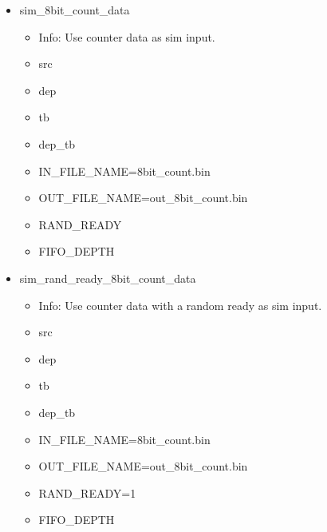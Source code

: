 \begin{itemize}
\begin{itemize}
	\item RAND\_READY=1
	\item FIFO\_DEPTH
	\end{itemize}
\item sim\_8bit\_count\_data
	\begin{itemize}
	\item[$\space$] Info: Use counter data as sim input.
	\item src
	\item dep
	\item tb
	\item dep\_tb
	\item IN\_FILE\_NAME=8bit\_count.bin
	\item OUT\_FILE\_NAME=out\_8bit\_count.bin
	\item RAND\_READY
	\item FIFO\_DEPTH
	\end{itemize}
\item sim\_rand\_ready\_8bit\_count\_data
	\begin{itemize}
	\item[$\space$] Info: Use counter data with a random ready as sim input.
	\item src
	\item dep
	\item tb
	\item dep\_tb
	\item IN\_FILE\_NAME=8bit\_count.bin
	\item OUT\_FILE\_NAME=out\_8bit\_count.bin
	\item RAND\_READY=1
	\item FIFO\_DEPTH
	\end{itemize}
\end{itemize}
